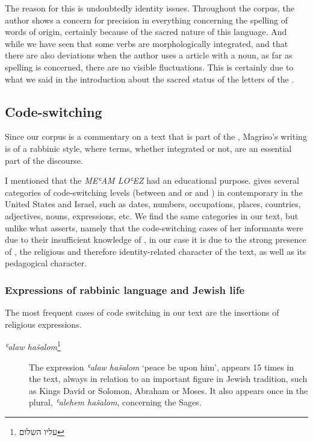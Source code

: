 \documentclass[output=paper,colorlinks,citecolor=brown,babel,arabicfont]{langscibook}
\begin{document}
The reason for this is undoubtedly identity issues. Throughout the corpus, the author shows a concern for precision in everything concerning the spelling of words of  origin, certainly because of the sacred nature of this language. And while we have seen that some verbs are morphologically integrated, and that there are also  deviations when the author uses a  article with a  noun, as far as spelling is concerned, there are no visible fluctuations. This is certainly due to what we said in the introduction about the sacred status of the letters of the  .

\subsection{Code-switching}\label{ch3.7.ss.3.2}

Since our corpus is a commentary on a text that is part of the , Magriso's writing is of a rabbinic style, where  terms, whether integrated or not, are an essential part of the discourse. 


I mentioned that the \textit{MEʿAM LOʿEZ} had an educational purpose. \citet[435--438]{harris1999} gives several categories of code-switching levels (between  and  or  and ) in contemporary  in the United States and Israel, such as dates, numbers, occupations, places, countries, adjectives, nouns, expressions, etc. We find the same categories in our text, but unlike what \citet[441]{harris1999} asserts, namely that the code-switching cases of her informants were due to their insufficient knowledge of , in our case it is due to the strong presence of , the religious and therefore identity-related character of the text, as well as its pedagogical character.


\subsubsection{Expressions of rabbinic language and Jewish life}\label{ch3.7.ss.3.2.1}

The most frequent cases of code switching in our text are the insertions of religious expressions. 

\begin{description}

 \item[\textit{ʿalaw hašalom}\footnote{\texthebrew{עליו השלום}}]

The expression \textit{ʿalaw hašalom} `peace be upon him', appears 15 times in the text, always in relation to an important figure in Jewish tradition, such as Kings David or Solomon, Abraham or Moses. It also appears once in the plural, \textit{ʿalehem hašalom}, concerning the Sages.
\end{description}
\end{document}
